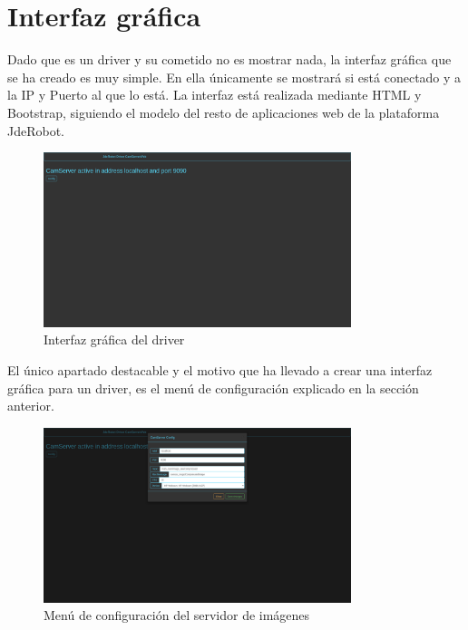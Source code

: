 \section{Interfaz gráfica}
Dado que es un driver y su cometido no es mostrar nada, la interfaz gráfica que se ha creado es muy simple. En ella únicamente se mostrará si está conectado y a la IP y Puerto al que lo está. 
La interfaz está realizada mediante HTML y Bootstrap, siguiendo el modelo del resto de aplicaciones web de la plataforma JdeRobot.
\begin{figure}[H]
  \begin{center}
    \includegraphics[width=0.8\textwidth]{figures/Interfazcamserver.png}
		\caption{Interfaz gráfica del driver}
		\label{fig.interfazcamserver}
		\end{center}
\end{figure}
El único apartado destacable y el motivo que ha llevado a crear una interfaz gráfica para un driver, es el menú de configuración explicado en la sección anterior.
 \begin{figure}[H]
  \begin{center}
    \includegraphics[width=0.8\textwidth]{figures/configcamserver.png}
		\caption{Menú de configuración del servidor de imágenes}
		\label{fig.configcamserver}
		\end{center}
\end{figure}

